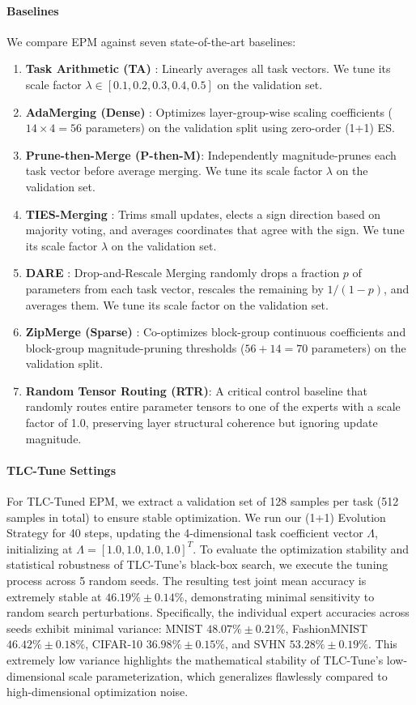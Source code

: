 \paragraph{Baselines}
We compare EPM against seven state-of-the-art baselines:
\begin{enumerate}
  \item \textbf{Task Arithmetic (TA)} \cite{ilharco2023editing}: Linearly averages all task vectors. We tune its scale factor $\lambda \in [0.1, 0.2, 0.3, 0.4, 0.5]$ on the validation set.
  \item \textbf{AdaMerging (Dense)} \cite{yang2024adamerging}: Optimizes layer-group-wise scaling coefficients ($14 \times 4 = 56$ parameters) on the validation split using zero-order (1+1) ES.
  \item \textbf{Prune-then-Merge (P-then-M)}: Independently magnitude-prunes each task vector before average merging. We tune its scale factor $\lambda$ on the validation set.
  \item \textbf{TIES-Merging} \cite{yadav2023ties}: Trims small updates, elects a sign direction based on majority voting, and averages coordinates that agree with the sign. We tune its scale factor $\lambda$ on the validation set.
  \item \textbf{DARE} \cite{yu2024dare}: Drop-and-Rescale Merging randomly drops a fraction $p$ of parameters from each task vector, rescales the remaining by $1/(1-p)$, and averages them. We tune its scale factor on the validation set.
  \item \textbf{ZipMerge (Sparse)} \cite{stoica2023zip}: Co-optimizes block-group continuous coefficients and block-group magnitude-pruning thresholds ($56 + 14 = 70$ parameters) on the validation split.
  \item \textbf{Random Tensor Routing (RTR)}: A critical control baseline that randomly routes entire parameter tensors to one of the experts with a scale factor of 1.0, preserving layer structural coherence but ignoring update magnitude.
\end{enumerate}

\paragraph{TLC-Tune Settings}
For TLC-Tuned EPM, we extract a validation set of 128 samples per task (512 samples in total) to ensure stable optimization. We run our (1+1) Evolution Strategy for 40 steps, updating the 4-dimensional task coefficient vector $\Lambda$, initializing at $\Lambda = [1.0, 1.0, 1.0, 1.0]^T$. To evaluate the optimization stability and statistical robustness of TLC-Tune's black-box search, we execute the tuning process across 5 random seeds. The resulting test joint mean accuracy is extremely stable at $46.19\% \pm 0.14\%$, demonstrating minimal sensitivity to random search perturbations. Specifically, the individual expert accuracies across seeds exhibit minimal variance: MNIST $48.07\% \pm 0.21\%$, FashionMNIST $46.42\% \pm 0.18\%$, CIFAR-10 $36.98\% \pm 0.15\%$, and SVHN $53.28\% \pm 0.19\%$. This extremely low variance highlights the mathematical stability of TLC-Tune's low-dimensional scale parameterization, which generalizes flawlessly compared to high-dimensional optimization noise.

